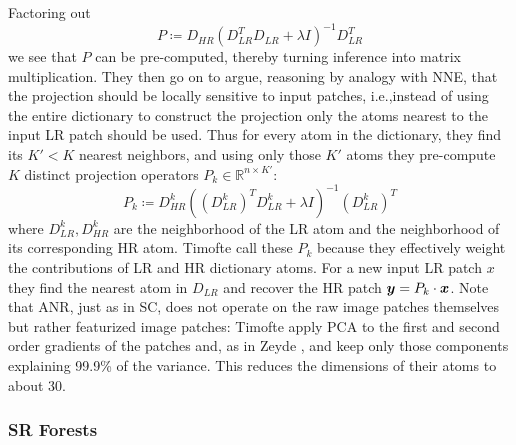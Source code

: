 Factoring out
\begin{equation}
    P \coloneqq D_{HR} \left( D_{LR}^T D_{LR} + \lambda I\right)^{-1}D_{LR}^T
\end{equation}
we see that \(P\) can be pre-computed, thereby turning inference into matrix multiplication.
%
They then go on to argue, reasoning by analogy with NNE, that the projection should be locally sensitive to input patches, i.e.,instead of using the entire dictionary to construct the projection only the atoms nearest to the input LR patch should be used.
%
Thus for every atom in the dictionary, they find its \(K' < K\) nearest neighbors, and using only those \(K'\) atoms they pre-compute \(K\) distinct projection operators \(P_k \in \mathbb{R}^{n \times K'}\):
\begin{equation}
    P_k \coloneqq D_{HR}^k \left( (D_{LR}^k)^T D_{LR}^k + \lambda I\right)^{-1}(D_{LR}^k)^T
    \label{eqn:datadependentmapping}
\end{equation}
where \(D_{LR}^k, D_{HR}^k\) are the neighborhood of the LR atom and the neighborhood of its corresponding HR atom.
%
Timofte \etal call these \(P_k\)  because they effectively weight the contributions of LR and HR dictionary atoms.
%
For a new input LR patch \(x\) they find the nearest atom in \(D_{LR}\) and recover the HR patch \(\bm{y} = P_k \cdot \bm{x}\).
%
Note that ANR, just as in SC, does not operate on the raw image patches themselves but rather featurized image patches: Timofte \etal apply PCA to the first and second order gradients of the patches and, as in Zeyde \etal \cite{Zeyde2012}, and keep only those components explaining 99.9\% of the variance.
%
This reduces the dimensions of their atoms to about 30.

\subsubsection{SR Forests}

